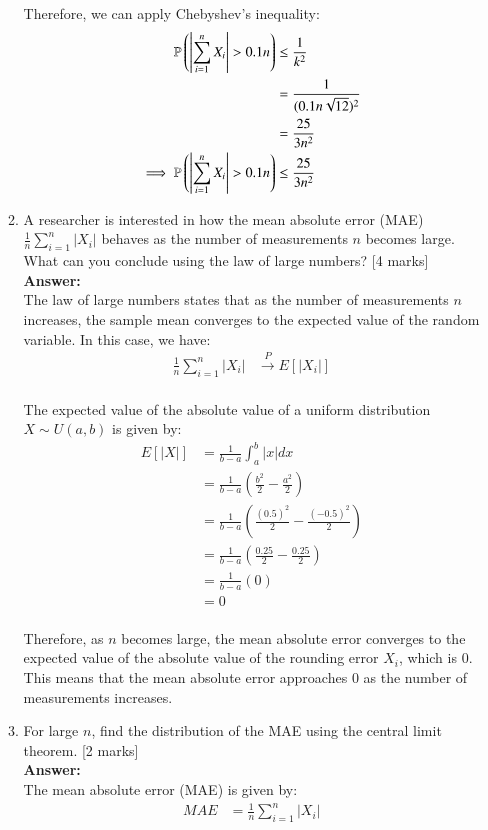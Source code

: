 \documentclass[12pt]{article}
\begin{document}
\begin{enumerate}
\begin{enumerate}
Therefore, we can apply Chebyshev's inequality:
\begin{align*}
{\mathbb P}\left(\left|\sum_{i=1}^n X_i\right| > 0.1 n\right) &\leq \frac{1}{k^2} \\
&= \frac{1}{(0.1 n \sqrt{12})^2} \\
&= \frac{25}{3 n^2} \\
\implies {\mathbb P}\left(\left|\sum_{i=1}^n X_i\right| > 0.1 n\right) &\leq \frac{25}{3 n^2} \\
\end{align*}
%

\item A researcher is interested in how the mean absolute error (MAE) $\frac{1}{n} \sum_{i=1}^n |X_i|$ behaves as the number of measurements $n$ becomes large. What can you conclude using the law of large numbers?
			\hfill [4 marks]
%
\\
\textbf{Answer:}
\\
The law of large numbers states that as the number of measurements $n$ increases, the sample mean converges to the expected value of the random variable. In this case, we have:
\begin{align*}
\frac{1}{n} \sum_{i=1}^n |X_i| &\xrightarrow{P} E[|X_i|] \\
\end{align*}

The expected value of the absolute value of a uniform distribution $X \sim U(a, b)$ is given by:
\begin{align*}
E[|X|] &= \frac{1}{b-a} \int_a^b |x| dx \\
&= \frac{1}{b-a} \left(\frac{b^2}{2} - \frac{a^2}{2}\right) \\
&= \frac{1}{b-a} \left(\frac{(0.5)^2}{2} - \frac{(-0.5)^2}{2}\right) \\
&= \frac{1}{b-a} \left(\frac{0.25}{2} - \frac{0.25}{2}\right) \\
&= \frac{1}{b-a} \left(0\right) \\
&= 0 \\
\end{align*}

Therefore, as $n$ becomes large, the mean absolute error converges to the expected value of the absolute value of the rounding error $X_i$, which is $0$. This means that the mean absolute error approaches $0$ as the number of measurements increases.
%

\item For large $n$, find the distribution of the MAE using the central limit theorem. 
			\hfill [2 marks]
%
\\
\textbf{Answer:}
\\
The mean absolute error (MAE) is given by:
\begin{align*}
MAE &= \frac{1}{n} \sum_{i=1}^n |X_i|
\end{align*}


\end{enumerate}
\end{enumerate}
\end{document}

